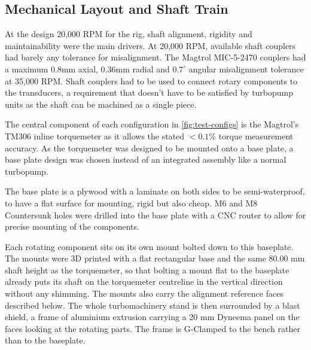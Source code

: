 \subsection{Mechanical Layout and Shaft Train}

At the design 20,000 RPM for the rig, shaft alignment, rigidity and maintainability were the main drivers. At 20,000 RPM, available shaft couplers had barely any tolerance for misalignment. The Magtrol MIC-5-2470 couplers had a maximum 0.8mm axial, 0.36mm radial and $0.7^\circ$ angular misalignment tolerance at 35,000 RPM. Shaft couplers had to be used to connect rotary components to the transducers, a requirement that doesn't have to be satisfied by turbopump units as the shaft can be machined as a single piece.

The central component of each configuration in \cref{fig:test-configs} is the Magtrol's TM306 inline torquemeter as it allows the stated $<0.1 \%$ torque measurement accuracy. As the torquemeter was designed to be mounted onto a base plate, a base plate design was chosen instead of an integrated assembly like a normal turbopump.

The base plate is a \valRigBaseplateThk plywood with a laminate on both sides to be semi-waterproof, to have a flat surface for mounting, rigid but also cheap. M6 and M8 Countersunk holes were drilled into the base plate with a CNC router to allow for precise mounting of the components.

Each rotating component sits on its own mount bolted down to this baseplate. The mounts were 3D printed with a flat rectangular base and the same 80.00 mm shaft height as the torquemeter, so that bolting a mount flat to the baseplate already puts its shaft on the torquemeter centreline in the vertical direction without any shimming. The mounts also carry the alignment reference faces described below. The whole turbomachinery stand is then surrounded by a blast shield, a frame of aluminium extrusion carrying a 20 mm Dyneema panel on the faces looking at the rotating parts. The frame is G-Clamped to the bench rather than to the baseplate.


